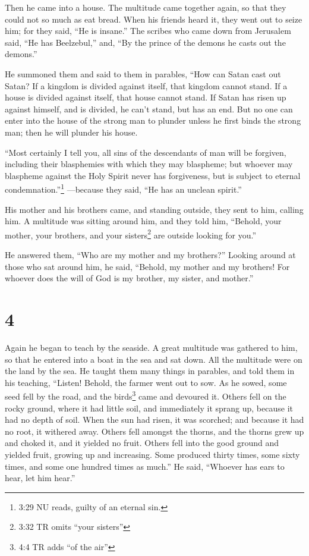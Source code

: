 Then he came into a house.  The multitude came together
again, so that they could not so much as eat bread.  When
his friends heard it, they went out to seize him; for they said, ``He is
insane.''  The scribes who came down from Jerusalem said,
``He has Beelzebul,'' and, ``By the prince of the demons he casts out
the demons.''

 He summoned them and said to them in parables, ``How can
Satan cast out Satan?  If a kingdom is divided against
itself, that kingdom cannot stand.  If a house is divided
against itself, that house cannot stand.  If Satan has
risen up against himself, and is divided, he can't stand, but has an
end.  But no one can enter into the house of the strong man
to plunder unless he first binds the strong man; then he will plunder
his house.

 ``Most certainly I tell you, all sins of the descendants
of man will be forgiven, including their blasphemies with which they may
blaspheme;  but whoever may blaspheme against the Holy
Spirit never has forgiveness, but is subject to eternal
condemnation.''\footnote{3:29 NU reads, guilty of an eternal sin.}
 ---because they said, ``He has an unclean spirit.''

 His mother and his brothers came, and standing outside,
they sent to him, calling him.  A multitude was sitting
around him, and they told him, ``Behold, your mother, your brothers, and
your sisters\footnote{3:32 TR omits ``your sisters''} are outside
looking for you.''

 He answered them, ``Who are my mother and my brothers?''
 Looking around at those who sat around him, he said,
``Behold, my mother and my brothers!  For whoever does the
will of God is my brother, my sister, and mother.''

\hypertarget{section-3}{%
\section{4}\label{section-3}}

 Again he began to teach by the seaside. A great multitude
was gathered to him, so that he entered into a boat in the sea and sat
down. All the multitude were on the land by the sea.  He
taught them many things in parables, and told them in his teaching,
 ``Listen! Behold, the farmer went out to sow. 
As he sowed, some seed fell by the road, and the birds\footnote{4:4 TR
  adds ``of the air''} came and devoured it.  Others fell on
the rocky ground, where it had little soil, and immediately it sprang
up, because it had no depth of soil.  When the sun had
risen, it was scorched; and because it had no root, it withered away.
 Others fell amongst the thorns, and the thorns grew up and
choked it, and it yielded no fruit.  Others fell into the
good ground and yielded fruit, growing up and increasing. Some produced
thirty times, some sixty times, and some one hundred times as much.''
 He said, ``Whoever has ears to hear, let him hear.''

